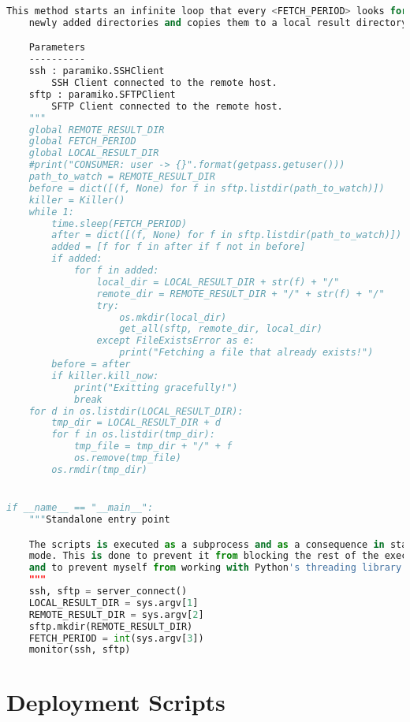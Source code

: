 \begin{lstlisting}[language=Python,caption={Implementation of the \texttt{consumer} service.},label=code:consumer]
    This method starts an infinite loop that every <FETCH_PERIOD> looks for
    newly added directories and copies them to a local result directory.

    Parameters
    ----------
    ssh : paramiko.SSHClient
        SSH Client connected to the remote host.
    sftp : paramiko.SFTPClient
        SFTP Client connected to the remote host.
    """
    global REMOTE_RESULT_DIR
    global FETCH_PERIOD
    global LOCAL_RESULT_DIR
    #print("CONSUMER: user -> {}".format(getpass.getuser()))
    path_to_watch = REMOTE_RESULT_DIR
    before = dict([(f, None) for f in sftp.listdir(path_to_watch)])
    killer = Killer()
    while 1:
        time.sleep(FETCH_PERIOD)
        after = dict([(f, None) for f in sftp.listdir(path_to_watch)])
        added = [f for f in after if f not in before]
        if added:
            for f in added:
                local_dir = LOCAL_RESULT_DIR + str(f) + "/"
                remote_dir = REMOTE_RESULT_DIR + "/" + str(f) + "/"
                try:
                    os.mkdir(local_dir)
                    get_all(sftp, remote_dir, local_dir)
                except FileExistsError as e:
                    print("Fetching a file that already exists!")
        before = after
        if killer.kill_now:
            print("Exitting gracefully!")
            break
    for d in os.listdir(LOCAL_RESULT_DIR):
        tmp_dir = LOCAL_RESULT_DIR + d
        for f in os.listdir(tmp_dir):
            tmp_file = tmp_dir + "/" + f
            os.remove(tmp_file)
        os.rmdir(tmp_dir)


if __name__ == "__main__":
    """Standalone entry point

    The scripts is executed as a subprocess and as a consequence in standalone
    mode. This is done to prevent it from blocking the rest of the execution
    and to prevent myself from working with Python's threading library.
    """
    ssh, sftp = server_connect()
    LOCAL_RESULT_DIR = sys.argv[1]
    REMOTE_RESULT_DIR = sys.argv[2]
    sftp.mkdir(REMOTE_RESULT_DIR)
    FETCH_PERIOD = int(sys.argv[3])
    monitor(ssh, sftp)
\end{lstlisting}
\section{Deployment Scripts}

